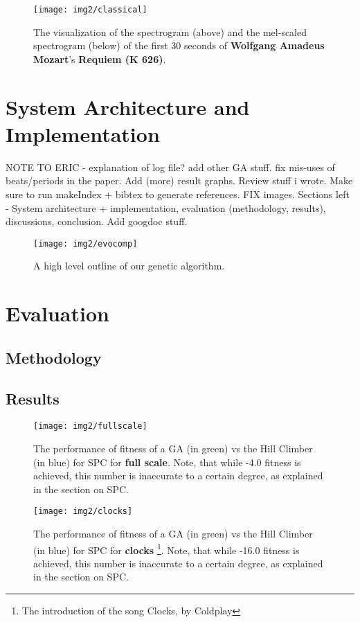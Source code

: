 \documentclass{pnastwo}
\begin{document}
\begin{article}
\begin{figure}
\centerline{\texttt{[image: img2/classical]}}
\caption{The visualization of the spectrogram (above) and the mel-scaled spectrogram (below) of the first 30 seconds of \textbf{Wolfgang Amadeus Mozart}'s \textbf{Requiem (K 626)}.}\label{fig3}
\end{figure}


\section{System Architecture and Implementation}
NOTE TO ERIC - explanation of log file? add other GA stuff. fix mis-uses of beats/periods in the paper. Add (more) result graphs. Review stuff i wrote. Make sure to run makeIndex + bibtex to generate references. FIX images. Sections left - System architecture + implementation, evaluation (methodology, results), discussions, conclusion. Add googdoc stuff.
\begin{figure*}
\centerline{\texttt{[image: img2/evocomp]}}
\caption{A high level outline of our genetic algorithm.}\label{fig2}
\end{figure*}

\section{Evaluation}
\subsection{Methodology}
\subsection{Results}
\begin{figure}
\centerline{\texttt{[image: img2/fullscale]}}
\caption{The performance of fitness of a GA (in green) vs the Hill Climber (in blue) for SPC for \textbf{full scale}. Note, that while -4.0 fitness is achieved, this number is inaccurate to a certain degree, as explained in the section on SPC.}\label{fig7}
\end{figure}

\begin{figure}
\centerline{\texttt{[image: img2/clocks]}}
\caption{The performance of fitness of a GA (in green) vs the Hill Climber (in blue) for SPC for \textbf{clocks} \footnote{The introduction of the song Clocks, by Coldplay}. Note, that while -16.0 fitness is achieved, this number is inaccurate to a certain degree, as explained in the section on SPC.}\label{fig8}
\end{figure}


\end{article}
\end{document}
